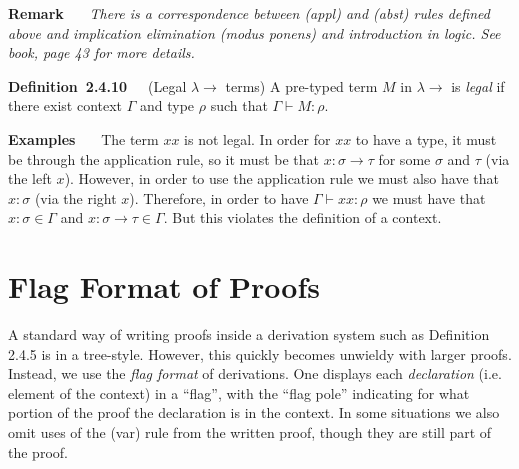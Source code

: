 \documentclass[letterpaper]{article}
\newenvironment{remarkNonNum}[1][]{\par\medskip
	\noindent \textbf{Remark}~~~#1 \rmfamily\em}{\medskip}
\newenvironment{examplesNonNum}[1][]{\par\medskip
	\noindent \textbf{Examples}~~~#1 \rmfamily}{\medskip}
\newenvironment{definition}[2][]{\par\medskip
	\noindent \textbf{Definition~#2}~~~#1 \rmfamily}{\medskip}
\newcommand{\larr}{\lambda \!\! \rightarrow}
\begin{document}
\begin{remarkNonNum}
	There is a correspondence between (appl) and (abst) rules defined above and implication elimination (modus ponens) and introduction in logic. See book, page 43 for more details.
\end{remarkNonNum}

\begin{definition}[(Legal $\larr$ terms)]{2.4.10}
	A pre-typed term $M$ in $\larr$ is \emph{legal} if there exist context $\Gamma$ and type $\rho$ such that $\Gamma \vdash M : \rho$.
\end{definition}

\begin{examplesNonNum}
	The term $x x$ is not legal. In order for $x x$ to have a type, it must be through the application rule, so it must be that $x : \sigma \to \tau$ for some $\sigma$ and $\tau$ (via the left $x$). However, in order to use the application rule we must also have that $x : \sigma$ (via the right $x$). Therefore, in order to have $\Gamma \vdash x x : \rho$ we must have that $x : \sigma \in \Gamma$ and $x : \sigma \to \tau \in \Gamma$. But this violates the definition of a context.
\end{examplesNonNum}

\section{Flag Format of Proofs}

A standard way of writing proofs inside a derivation system such as Definition 2.4.5 is in a tree-style. However, this quickly becomes unwieldy with larger proofs. Instead, we use the \emph{flag format} of derivations. One displays each \emph{declaration} (i.e. element of the context) in a ``flag'', with the ``flag pole'' indicating for what portion of the proof the declaration is in the context. In some situations we also omit uses of the (var) rule from the written proof, though they are still part of the proof.
\end{document}

